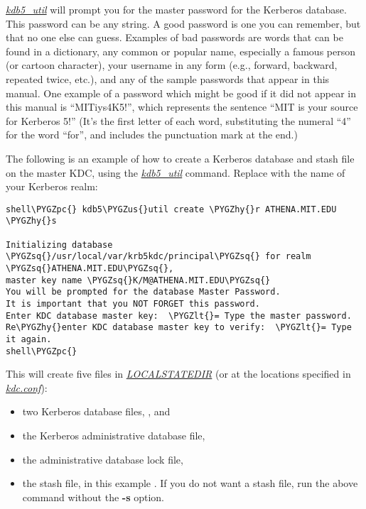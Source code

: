 \documentclass[letterpaper,10pt,english]{sphinxmanual}
\def\PYGZus{\char`\_}
\def\PYGZlt{\char`\<}
\def\PYGZpc{\char`\%}
\def\PYGZhy{\char`\-}
\def\PYGZsq{\char`\'}
\begin{document}
{\hyperref[admin/admin_commands/kdb5_util:kdb5-util-8]{\emph{kdb5\_util}}} will prompt you for the master password for the
Kerberos database.  This password can be any string.  A good password
is one you can remember, but that no one else can guess.  Examples of
bad passwords are words that can be found in a dictionary, any common
or popular name, especially a famous person (or cartoon character),
your username in any form (e.g., forward, backward, repeated twice,
etc.), and any of the sample passwords that appear in this manual.
One example of a password which might be good if it did not appear in
this manual is ``MITiys4K5!'', which represents the sentence ``MIT is
your source for Kerberos 5!''  (It's the first letter of each word,
substituting the numeral ``4'' for the word ``for'', and includes the
punctuation mark at the end.)

The following is an example of how to create a Kerberos database and
stash file on the master KDC, using the {\hyperref[admin/admin_commands/kdb5_util:kdb5-util-8]{\emph{kdb5\_util}}} command.
Replace  with the name of your Kerberos realm:

\begin{Verbatim}[commandchars=\\\{\}]
shell\PYGZpc{} kdb5\PYGZus{}util create \PYGZhy{}r ATHENA.MIT.EDU \PYGZhy{}s

Initializing database \PYGZsq{}/usr/local/var/krb5kdc/principal\PYGZsq{} for realm \PYGZsq{}ATHENA.MIT.EDU\PYGZsq{},
master key name \PYGZsq{}K/M@ATHENA.MIT.EDU\PYGZsq{}
You will be prompted for the database Master Password.
It is important that you NOT FORGET this password.
Enter KDC database master key:  \PYGZlt{}= Type the master password.
Re\PYGZhy{}enter KDC database master key to verify:  \PYGZlt{}= Type it again.
shell\PYGZpc{}
\end{Verbatim}

This will create five files in {\hyperref[mitK5defaults:paths]{\emph{LOCALSTATEDIR}}} (or at the locations specified
in {\hyperref[admin/conf_files/kdc_conf:kdc-conf-5]{\emph{kdc.conf}}}):
\begin{itemize}
\item {} 
two Kerberos database files, , and 

\item {} 
the Kerberos administrative database file, 

\item {} 
the administrative database lock file, 

\item {} 
the stash file, in this example .  If you do
not want a stash file, run the above command without the \textbf{-s}
option.

\end{itemize}
\end{document}
